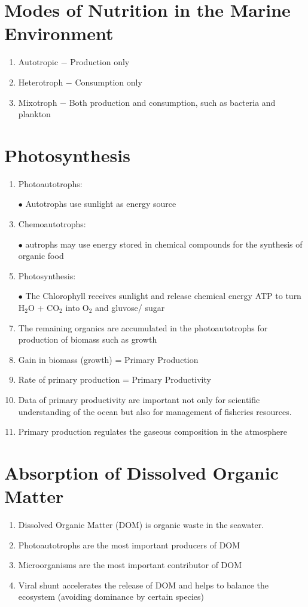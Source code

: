 \documentclass{report}
\begin{document}
\section{Modes of Nutrition in the Marine Environment}
\begin{enumerate}
    \item Autotropic $-$ Production only
    \item Heterotroph $-$ Consumption only
    \item Mixotroph $-$ Both production and consumption, such as bacteria and plankton 
\end{enumerate}


\section{Photosynthesis}
\begin{enumerate}
    \item Photoautotrophs: 
    \item [$\bullet$]Autotrophs use sunlight as energy source
    \item Chemoautotrophs:
    \item [$\bullet$]autrophs may use energy stored in chemical compounds for the synthesis of organic food
    \item Photosynthesis:
    \item [$\bullet$]The Chlorophyll receives sunlight and release chemical energy ATP to turn H$_{2}$O + CO$_{2}$ into O$_{2}$ and gluvose/ sugar
    \item  The remaining organics are accumulated in the
    photoautotrophs for production of biomass such as growth     
    \item Gain in biomass (growth) = Primary Production
    \item Rate of primary production = Primary Productivity 
    \item Data of primary productivity are important not
    only for scientific understanding of the ocean but
    also for management of fisheries resources.
    \item Primary production regulates the gaseous composition in the atmosphere
\end{enumerate}


\section{Absorption of Dissolved Organic Matter}
\begin{enumerate}
    \item Dissolved Organic Matter (DOM) is organic waste in the seawater. 
    \item Photoautotrophs are the most important producers of DOM 
    \item Microorganisms are the most important contributor of DOM
    \item Viral shunt accelerates the release of DOM and helps to balance the ecosystem (avoiding dominance
    by certain species)    
\end{enumerate}
\end{document}
